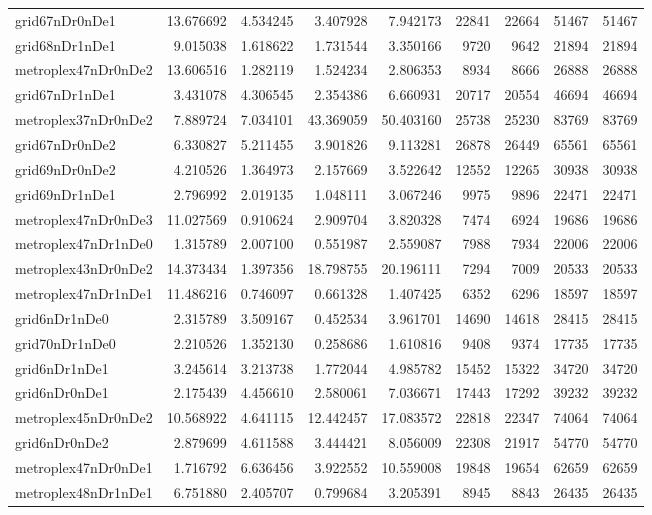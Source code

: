 \begin{longtable}{|l|r|r|r|r|r|r|r|r|}
grid67nDr0nDe1 & 13.676692 & 4.534245 & 3.407928 & 7.942173 & 22841 & 22664 & 51467 & 51467 \\
grid68nDr1nDe1 & 9.015038 & 1.618622 & 1.731544 & 3.350166 & 9720 & 9642 & 21894 & 21894 \\
metroplex47nDr0nDe2 & 13.606516 & 1.282119 & 1.524234 & 2.806353 & 8934 & 8666 & 26888 & 26888 \\
grid67nDr1nDe1 & 3.431078 & 4.306545 & 2.354386 & 6.660931 & 20717 & 20554 & 46694 & 46694 \\
metroplex37nDr0nDe2 & 7.889724 & 7.034101 & 43.369059 & 50.403160 & 25738 & 25230 & 83769 & 83769 \\
grid67nDr0nDe2 & 6.330827 & 5.211455 & 3.901826 & 9.113281 & 26878 & 26449 & 65561 & 65561 \\
grid69nDr0nDe2 & 4.210526 & 1.364973 & 2.157669 & 3.522642 & 12552 & 12265 & 30938 & 30938 \\
grid69nDr1nDe1 & 2.796992 & 2.019135 & 1.048111 & 3.067246 & 9975 & 9896 & 22471 & 22471 \\
metroplex47nDr0nDe3 & 11.027569 & 0.910624 & 2.909704 & 3.820328 & 7474 & 6924 & 19686 & 19686 \\
metroplex47nDr1nDe0 & 1.315789 & 2.007100 & 0.551987 & 2.559087 & 7988 & 7934 & 22006 & 22006 \\
metroplex43nDr0nDe2 & 14.373434 & 1.397356 & 18.798755 & 20.196111 & 7294 & 7009 & 20533 & 20533 \\
metroplex47nDr1nDe1 & 11.486216 & 0.746097 & 0.661328 & 1.407425 & 6352 & 6296 & 18597 & 18597 \\
grid6nDr1nDe0 & 2.315789 & 3.509167 & 0.452534 & 3.961701 & 14690 & 14618 & 28415 & 28415 \\
grid70nDr1nDe0 & 2.210526 & 1.352130 & 0.258686 & 1.610816 & 9408 & 9374 & 17735 & 17735 \\
grid6nDr1nDe1 & 3.245614 & 3.213738 & 1.772044 & 4.985782 & 15452 & 15322 & 34720 & 34720 \\
grid6nDr0nDe1 & 2.175439 & 4.456610 & 2.580061 & 7.036671 & 17443 & 17292 & 39232 & 39232 \\
metroplex45nDr0nDe2 & 10.568922 & 4.641115 & 12.442457 & 17.083572 & 22818 & 22347 & 74064 & 74064 \\
grid6nDr0nDe2 & 2.879699 & 4.611588 & 3.444421 & 8.056009 & 22308 & 21917 & 54770 & 54770 \\
metroplex47nDr0nDe1 & 1.716792 & 6.636456 & 3.922552 & 10.559008 & 19848 & 19654 & 62659 & 62659 \\
metroplex48nDr1nDe1 & 6.751880 & 2.405707 & 0.799684 & 3.205391 & 8945 & 8843 & 26435 & 26435 \\

\end{longtable}
